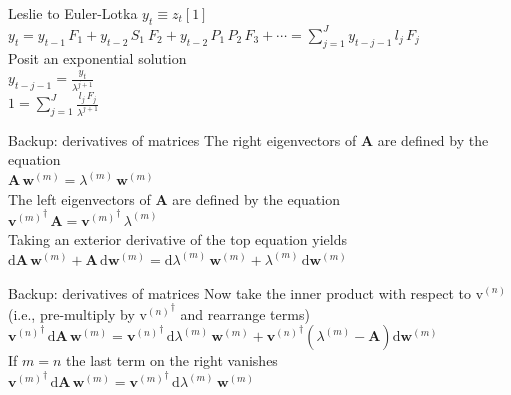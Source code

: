 \documentclass{beamer}
\newcommand{\greekbf}[1]{\boldsymbol{\mathrm{#1}}}
\begin{document}
\begin{frame}{Leslie to Euler-Lotka}
  $y_t \equiv z_t[1]$\\
  \vspace{.5cm}
  $y_t = y_{t-1} \, F_1 + y_{t-2} \, S_1 \ F_2 + y_{t-2} \, P_1 \, P_2 \, F_3 + \cdots = \displaystyle\sum\limits_{j=1}^{J} y_{t-j-1} \, l_j \, F_j$\\
  \vspace{.5cm}
  Posit an exponential solution\\
  \vspace{.5cm}
  $y_{t-j-1} = \frac{y_t}{\lambda^{j+1}}$\\
  \vspace{.5cm}
  $1 = \displaystyle\sum\limits_{j=1}^{J} \frac{l_j \, F_j}{\lambda^{j+1}}$\\
\end{frame}

\begin{frame}{Backup: derivatives of matrices}
  The right eigenvectors of $\mathbf{A}$ are defined by the equation\\
  \vspace{.5cm}
  $\mathbf{A} \, \mathbf{w}^{(m)} = \lambda^{(m)} \, \mathbf{w}^{(m)}$\\
  \vspace{.5cm}
  The left eigenvectors of $\mathbf{A}$ are defined by the equation\\
  ${\mathbf{v}^{(m)}}^{\dagger} \, \mathbf{A} =	{\mathbf{v}^{(m)}}^{\dagger} \, \lambda^{(m)}$\\
  \vspace{.5cm}
  Taking an exterior derivative of the top equation yields\\
  \vspace{.5cm}
  $\mathrm{d}\mathbf{A} \, \mathbf{w}^{(m)} + \mathbf{A} \, \mathrm{d}\mathbf{w}^{(m)}= \mathrm{d}\lambda^{(m)} \, \mathbf{w}^{(m)} + \lambda^{(m)} \, \mathrm{d}\mathbf{w}^{(m)}$\\
\end{frame}

\begin{frame}{Backup: derivatives of matrices}
  Now take the inner product with respect to $\greekbf{v}^{(n)}$ (i.e., pre-multiply by ${\greekbf{v}^{(n)}}^{\dagger}$ and rearrange terms)\\
  \vspace{.5cm}
  ${\mathbf{v}^{(n)}}^{\dagger} \, \mathrm{d}\mathbf{A} \, \mathbf{w}^{(m)} = {\mathbf{v}^{(n)}}^{\dagger} \, \mathrm{d}\lambda^{(m)} \, \mathbf{w}^{(m)} + {\mathbf{v}^{(n)}}^{\dagger} \left(\lambda^{(m)} - \mathbf{A} \right) \mathrm{d}\mathbf{w}^{(m)}$\\
  \vspace{.5cm}
  If $m=n$ the last term on the right vanishes\\
  \vspace{.5cm}
  ${\mathbf{v}^{(m)}}^{\dagger} \, \mathrm{d}\mathbf{A} \, \mathbf{w}^{(m)} = {\mathbf{v}^{(m)}}^{\dagger} \, \mathrm{d}\lambda^{(m)} \, \mathbf{w}^{(m)}$\\
\end{frame}
\end{document}
